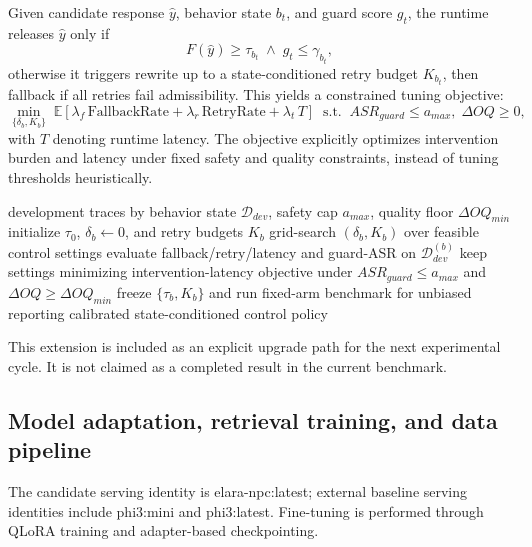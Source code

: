 ﻿\documentclass[a4paper,12pt]{article}
\begin{document}
Given candidate response \(\hat{y}\), behavior state \(b_t\), and guard score \(g_t\), the runtime releases \(\hat{y}\) only if
\begin{equation}
F(\hat{y})\ge \tau_{b_t}\;\land\; g_t\le \gamma_{b_t},
\end{equation}
otherwise it triggers rewrite up to a state-conditioned retry budget \(K_{b_t}\), then fallback if all retries fail admissibility. This yields a constrained tuning objective:
\begin{equation}
\min_{\{\delta_b,K_b\}} \;\mathbb{E}\!\left[\lambda_f\,\mathrm{FallbackRate}+\lambda_r\,\mathrm{RetryRate}+\lambda_t\,T\right]
\;\;\text{s.t.}\;\; ASR_{guard}\le a_{max},\; \Delta OQ\ge 0,
\end{equation}
with \(T\) denoting runtime latency. The objective explicitly optimizes intervention burden and latency under fixed safety and quality constraints, instead of tuning thresholds heuristically.

\begin{algorithm}[H]
\caption{State-conditioned control-threshold calibration}
\begin{algorithmic}[1]
\Require development traces by behavior state \(\mathcal{D}_{dev}\), safety cap \(a_{max}\), quality floor \(\Delta OQ_{min}\)
\State initialize \(\tau_0\), \(\delta_b\gets0\), and retry budgets \(K_b\)
  \State grid-search \((\delta_b,K_b)\) over feasible control settings
  \State evaluate fallback/retry/latency and guard-ASR on \(\mathcal{D}_{dev}^{(b)}\)
  \State keep settings minimizing intervention-latency objective under \(ASR_{guard}\le a_{max}\) and \(\Delta OQ\ge \Delta OQ_{min}\)
\EndFor
\State freeze \(\{\tau_b,K_b\}\) and run fixed-arm benchmark for unbiased reporting
\State \Return calibrated state-conditioned control policy
\end{algorithmic}
\end{algorithm}

This extension is included as an explicit upgrade path for the next experimental cycle. It is not claimed as a completed result in the current benchmark.

\subsection{Model adaptation, retrieval training, and data pipeline}

The candidate serving identity is elara-npc:latest; external baseline serving identities include phi3:mini and phi3:latest. Fine-tuning is performed through QLoRA training and adapter-based checkpointing.
\end{document}
